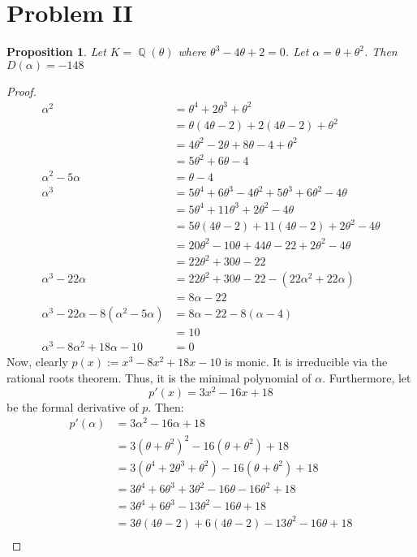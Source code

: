 \documentclass{article}
\newtheorem{proposition}[theorem]{Proposition}
\DeclareMathOperator{\Q}{\mathbb{Q}}
\begin{document}
\section{Problem II}
\begin{proposition}
	Let $K=\Q(\theta)$ where $\theta^3-4\theta+2=0$.  Let $\alpha=\theta+\theta^2$.  Then $D(\alpha) = -148$
\end{proposition}
\begin{proof}
	\begin{align*}
	\alpha^2&=\theta^4+2\theta^3+\theta^2\\
	&=\theta(4\theta-2)+2(4\theta-2)+\theta^2\\
	&=4\theta^2-2\theta+8\theta-4+\theta^2\\
	&=5\theta^2+6\theta-4\\
	\alpha^2-5\alpha&=\theta-4\\
	\alpha^3&=5\theta^4+6\theta^3-4\theta^2+5\theta^3+6\theta^2-4\theta\\
	&=5\theta^4+11\theta^3+2\theta^2-4\theta\\
	&=5\theta(4\theta-2)+11(4\theta-2)+2\theta^2-4\theta\\
	&=20\theta^2-10\theta+44\theta-22+2\theta^2-4\theta\\
	&=22\theta^2+30\theta-22\\
	\alpha^3-22\alpha&=22\theta^2+30\theta-22-(22\alpha^2+22\alpha)\\
	&= 8\alpha-22\\
	\alpha^3-22\alpha-8(\alpha^2-5\alpha)&=8\alpha-22-8(\alpha-4)\\
	&= 10\\
	\alpha^3-8\alpha^2+18\alpha-10&=0
	\end{align*}
	Now, clearly $p(x) := x^3-8x^2+18x-10$ is monic.  It is irreducible via the rational roots theorem.  Thus, it is the minimal polynomial of $\alpha$.  Furthermore, let $$p'(x) = 3x^2-16x+18$$ be the formal derivative of $p$.  Then:
	\begin{align*}
	p'(\alpha) &= 3\alpha^2-16\alpha+18\\
	&= 3(\theta+\theta^2)^2-16(\theta+\theta^2)+18\\
	&= 3(\theta^4+2\theta^3+\theta^2)-16(\theta+\theta^2)+18\\
	&= 3\theta^4+6\theta^3+3\theta^2-16\theta-16\theta^2+18\\
	&= 3\theta^4+6\theta^3-13\theta^2-16\theta+18\\
	&=3\theta(4\theta-2)+6(4\theta-2)-13\theta^2-16\theta+18\\

\end{align*}
\end{proof}
\end{document}
